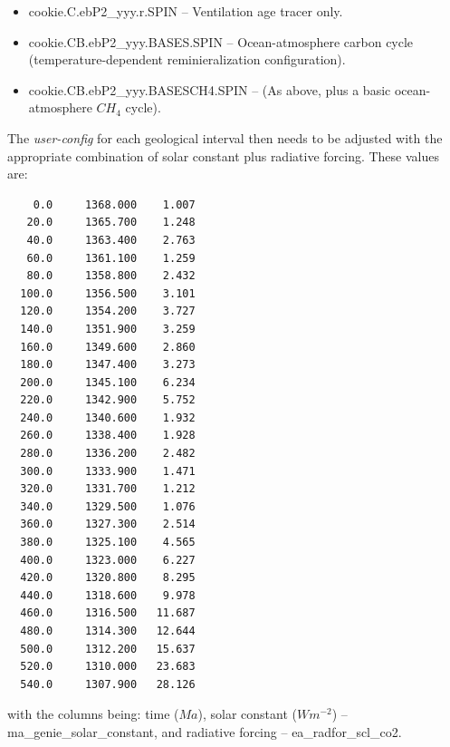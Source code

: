 \begin{itemize}[noitemsep]
\vspace{1mm}
\item [] \textsf{\footnotesize cookie.C.ebP2\_yyy.r.SPIN} -- Ventilation age tracer only.
\vspace{1mm}
\item [] \textsf{\footnotesize cookie.CB.ebP2\_yyy.BASES.SPIN} -- Ocean-atmosphere carbon cycle (temperature-dependent reminieralization configuration).
\vspace{1mm}
\item [] \textsf{\footnotesize cookie.CB.ebP2\_yyy.BASESCH4.SPIN} -- (As above, plus a basic ocean-atmosphere $CH_{4}$ cycle).
\end{itemize}

\newpage

\noindent The \textit{user-config} for each geological interval then needs to be adjusted with the appropriate combination of solar constant plus radiative forcing. These values are:
\vspace{-1mm}\footnotesize\begin{verbatim}
    0.0     1368.000    1.007
   20.0     1365.700    1.248
   40.0     1363.400    2.763
   60.0     1361.100    1.259
   80.0     1358.800    2.432
  100.0     1356.500    3.101
  120.0     1354.200    3.727
  140.0     1351.900    3.259
  160.0     1349.600    2.860
  180.0     1347.400    3.273
  200.0     1345.100    6.234
  220.0     1342.900    5.752
  240.0     1340.600    1.932
  260.0     1338.400    1.928
  280.0     1336.200    2.482
  300.0     1333.900    1.471
  320.0     1331.700    1.212
  340.0     1329.500    1.076
  360.0     1327.300    2.514
  380.0     1325.100    4.565
  400.0     1323.000    6.227
  420.0     1320.800    8.295
  440.0     1318.600    9.978
  460.0     1316.500   11.687
  480.0     1314.300   12.644
  500.0     1312.200   15.637
  520.0     1310.000   23.683
  540.0     1307.900   28.126
\end{verbatim}\normalsize\vspace{-1mm}
with the columns being: time ($Ma$), solar constant ($W m^{-2}$) -- \textsf{\footnotesize ma\_genie\_solar\_constant}, and radiative forcing -- \textsf{\footnotesize ea\_radfor\_scl\_co2}.

